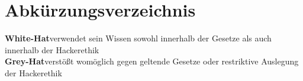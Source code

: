 {\let\cleardoublepage\relax \chapter*{Abkürzungsverzeichnis}}
\textbf{White-Hat}\dotfill verwendet sein Wissen sowohl innerhalb der Gesetze als auch innerhalb der Hackerethik\\
\textbf{Grey-Hat}\dotfill verstößt womöglich gegen geltende Gesetze oder restriktive Auslegung der Hackerethik\\